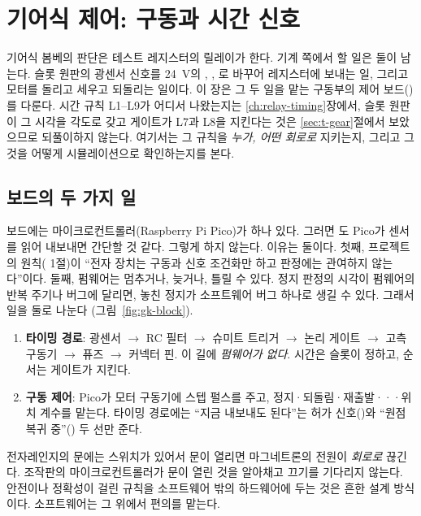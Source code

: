 \chapter{기어식 제어: 구동과 시간 신호}\label{ch:52-gear-control}

기어식 봄베의 판단은 테스트 레지스터의 릴레이가 한다. 기계 쪽에서 할 일은 둘이 남는다. 슬롯 원판의 광센서 신호를
24~V의 , , 로 바꾸어 레지스터에 보내는 일, 그리고 모터를 돌리고 세우고 되돌리는 일이다.
이 장은 그 두 일을 맡는 구동부의 제어 보드()를 다룬다. 시간 규칙 L1--L9가 어디서
나왔는지는 \ref{ch:relay-timing}장에서, 슬롯 원판이 그 시각을 각도로 갖고 게이트가 L7과 L8을 지킨다는 것은
\ref{sec:t-gear}절에서 보았으므로 되풀이하지 않는다. 여기서는 그 규칙을 \emph{누가, 어떤 회로로} 지키는지,
그리고 그것을 어떻게 시뮬레이션으로 확인하는지를 본다.

\section{보드의 두 가지 일}\label{sec:gk-overview}

\Why 보드에는 마이크로컨트롤러(Raspberry Pi Pico)가 하나 있다. 그러면 도 Pico가 센서를 읽어 내보내면
간단할 것 같다. 그렇게 하지 않는다. 이유는 둘이다. 첫째, 프로젝트의 원칙( 1절)이 ``전자 장치는
구동과 신호 조건화만 하고 판정에는 관여하지 않는다''이다. 둘째, 펌웨어는 멈추거나, 늦거나, 틀릴 수 있다. 정지 판정의
시각이 펌웨어의 반복 주기나 버그에 달리면, 놓친 정지가 소프트웨어 버그 하나로 생길 수 있다. 그래서 일을 둘로 나눈다
(그림~\ref{fig:gk-block}).

\begin{enumerate}
\item \textbf{타이밍 경로}: 광센서 $\to$ RC 필터 $\to$ 슈미트 트리거 $\to$ 논리 게이트 $\to$ 고측 구동기 $\to$ 퓨즈 $\to$
커넥터 핀. 이 길에 \emph{펌웨어가 없다}. 시간은 슬롯이 정하고, 순서는 게이트가 지킨다.
\item \textbf{구동 제어}: Pico가 모터 구동기에 스텝 펄스를 주고, 정지·되돌림·재출발···위치 계수를
맡는다. 타이밍 경로에는 ``지금 내보내도 된다''는 허가 신호()와 ``원점 복귀 중''() 두 선만 준다.
\end{enumerate}

\General 전자레인지의 문에는 스위치가 있어서 문이 열리면 마그네트론의 전원이 \emph{회로로} 끊긴다. 조작판의 마이크로컨트롤러가
문이 열린 것을 알아채고 끄기를 기다리지 않는다. 안전이나 정확성이 걸린 규칙을 소프트웨어 밖의 하드웨어에 두는 것은
흔한 설계 방식이다. 소프트웨어는 그 위에서 편의를 맡는다.

